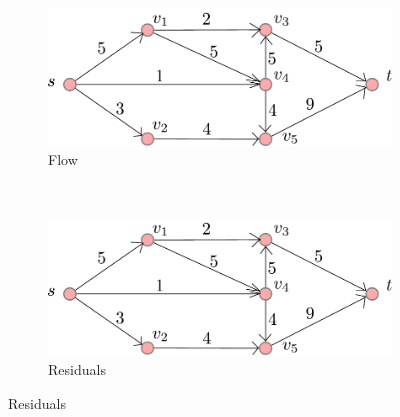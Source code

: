 \documentclass{article}
\begin{document}
\begin{figure}

    \centering

    \begin{subfigure}[b]{.45\textwidth}

        \includegraphics[width=\textwidth]{../figs/graph}\caption*{Flow}

    \end{subfigure}

    ~~

    \begin{subfigure}[b]{.45\textwidth}

        \includegraphics[width=\textwidth]{../figs/graph}\caption*{Residuals}

    \end{subfigure}

\end{figure}
\end{document}
